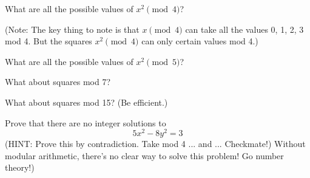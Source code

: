 \mbox{}
  \begin{myenum} 
    
  \item What are all the possible values of
    $x^2 \pmod{4}$?

    (Note: The key thing to note is that
    $x \pmod 4$ can take all the values 0, 1, 2, 3 mod 4.
    But the squares $x^2 \pmod 4$ can only certain values mod 4.)
    
  \item What are all the possible values of
    $x^2 \pmod{5}$?

  \item What about squares mod 7?
  
  \item What about squares mod 15? (Be efficient.)

  \item
    Prove that there are no integer solutions to
    \[
      5x^2 - 8y^2 = 3
    \]
    (HINT: Prove this by contradiction. Take mod 4 ... and ... Checkmate!)
    Without modular arithmetic, there's no clear way to
    solve this problem! Go number theory!)
  \end{myenum}
